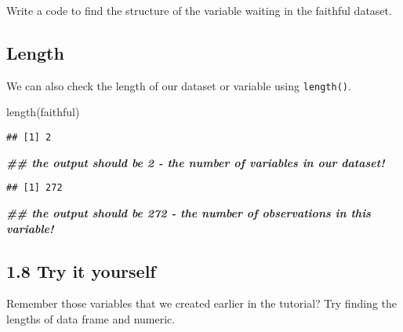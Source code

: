 \documentclass[
]{book}
\newenvironment{Shaded}{\begin{snugshade}}{\end{snugshade}}
\newcommand{\DocumentationTok}[1]{\textcolor[rgb]{0.56,0.35,0.01}{\textbf{\textit{#1}}}}
\newcommand{\FunctionTok}[1]{\textcolor[rgb]{0.00,0.00,0.00}{#1}}
\newcommand{\NormalTok}[1]{#1}
\newcommand{\SpecialCharTok}[1]{\textcolor[rgb]{0.00,0.00,0.00}{#1}}
\begin{document}
Write a code to find the structure of the variable waiting in the faithful dataset.

\hypertarget{length}{%
\subsection{Length}\label{length}}

We can also check the length of our dataset or variable using \texttt{length()}.

\begin{Shaded}
\begin{Highlighting}[]
\FunctionTok{length}\NormalTok{(faithful)}
\end{Highlighting}
\end{Shaded}

\begin{verbatim}
## [1] 2
\end{verbatim}

\begin{Shaded}
\begin{Highlighting}[]
    \DocumentationTok{\#\# the output should be 2 {-} the number of variables in our dataset!}
\end{Highlighting}
\end{Shaded}

\begin{Shaded}
\end{Shaded}

\begin{verbatim}
## [1] 272
\end{verbatim}

\begin{Shaded}
\begin{Highlighting}[]
    \DocumentationTok{\#\# the output should be 272 {-} the number of observations in this variable!}
\end{Highlighting}
\end{Shaded}

\hypertarget{try-it-yourself-7}{%
\subsection{1.8 Try it yourself}\label{try-it-yourself-7}}

Remember those variables that we created earlier in the tutorial? Try finding the lengths of data frame and numeric.
\end{document}
